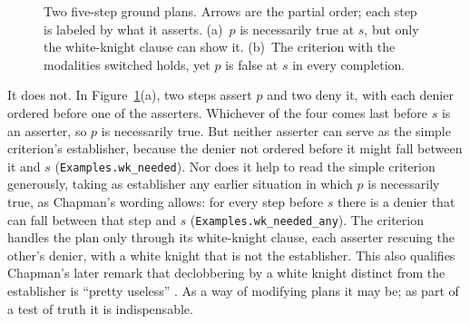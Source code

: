 \documentclass[11pt]{article}
\newcommand{\lean}[1]{\texttt{#1}}
\begin{document}
\begin{figure}[t]
\centering
{}
\caption{Two five-step ground plans. Arrows are the partial order; each
step is labeled by what it asserts. (a)~$p$ is necessarily true at $s$,
but only the white-knight clause can show it. (b)~The criterion with the
modalities switched holds, yet $p$ is false at $s$ in every completion.}
\label{fig:plans}
\end{figure}

It does not. In Figure~\ref{fig:plans}(a), two steps assert $p$ and two
deny it, with each denier ordered before one of the asserters. Whichever of
the four comes last before $s$ is an asserter, so $p$ is necessarily true.
But neither asserter can serve as the simple criterion's establisher,
because the denier not ordered before it might fall between it and $s$
(\lean{Examples.wk\_needed}). Nor does it help to read the simple criterion
generously, taking as establisher any earlier situation in which $p$ is
necessarily true, as Chapman's wording allows: for every step before $s$
there is a denier that can fall between that step and $s$
(\lean{Examples.wk\_needed\_any}). The criterion handles the plan only through
its white-knight clause, each asserter rescuing the other's denier, with a
white knight that is not the establisher. This also qualifies Chapman's
later remark that declobbering by a white knight distinct from the
establisher is ``pretty useless'' \citep[p.~32]{chapman1985}. As a way of
modifying plans it may be; as part of a test of truth it is indispensable.
\end{document}
